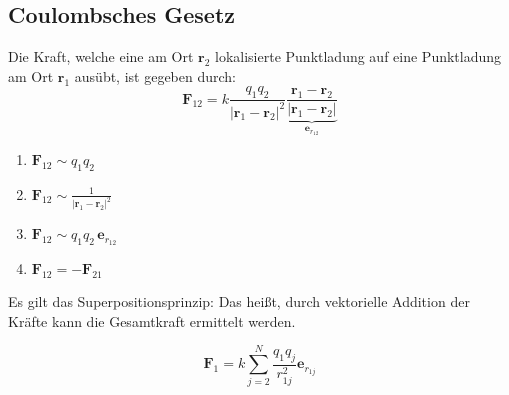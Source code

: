 \documentclass[titlepage,11pt,a4paper,ngerman]{report}
\newcommand{\summ}[2]{\sum_{#1}^{#2}}
\renewcommand{\vec}[1]{\boldsymbol{#1}}
\begin{document}
\subsection{Coulombsches Gesetz}

\begin{minipage}{.585\linewidth}
	Die Kraft, welche eine am Ort $\vec{r}_2$ lokalisierte Punktladung auf eine Punktladung am Ort $\vec{r}_1$ ausübt, ist gegeben durch:
	$$\vec{F}_{12} = k \frac{q_1 q_2}{|\vec{r}_1 - \vec{r}_2|^2} \underbrace{\frac{\vec{r}_1 - \vec{r}_2}{|\vec{r}_1 - \vec{r}_2|}}_{\vec{e}_{r_{12}}}$$
\end{minipage}
\begin{minipage}{.4\linewidth}
	\hspace{30pt}
\end{minipage}

\begin{enumerate}
	\item $\vec{F}_{12} \sim q_1 q_2$
	\item $\vec{F}_{12} \sim \frac{1}{|\vec{r}_1 - \vec{r}_2|^2}$
	\item $\vec{F}_{12} \sim q_1 q_2\, \vec{e}_{r_{12}}$
	\item $\vec{F}_{12} = -\vec{F}_{21}$
\end{enumerate}
Es gilt das Superpositionsprinzip: Das heißt, durch vektorielle Addition der Kräfte kann die Gesamtkraft ermittelt werden.

$$\vec{F}_1 = k \summ{j = 2}{N} \frac{q_1 q_j}{r_{1j}^2}\vec{e}_{r_{1j}}$$
\end{document}

